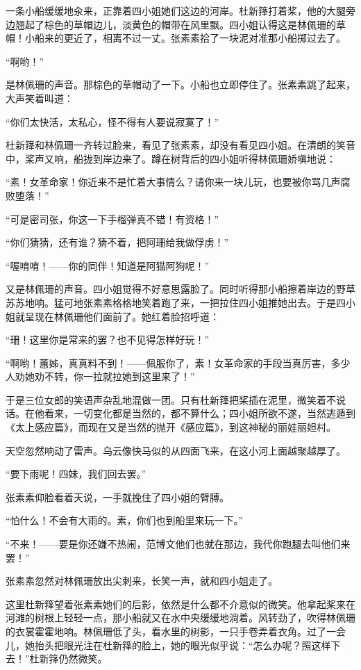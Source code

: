 \par 一条小船缓缓地汆来，正靠着四小姐她们这边的河岸。杜新箨打着桨，他的大腿旁边翘起了棕色的草帽边儿，淡黄色的帽带在风里飘。四小姐认得这是林佩珊的草帽！小船来的更近了，相离不过一丈。张素素拾了一块泥对准那小船掷过去了。
\par “啊哟！”
\par 是林佩珊的声音。那棕色的草帽动了一下。小船也立即停住了。张素素跳了起来，大声笑着叫道：
\par “你们太快活，太私心，怪不得有人要说寂寞了！”
\par 杜新箨和林佩珊一齐转过脸来，看见了张素素，却没有看见四小姐。在清朗的笑音中，桨声又响，船拢到岸边来了。蹲在树背后的四小姐听得林佩珊娇嗔地说：
\par “素！女革命家！你近来不是忙着大事情么？请你来一块儿玩，也要被你骂几声腐败堕落！”
\par “可是密司张，你这一下手榴弹真不错！有资格！”
\par “你们猜猜，还有谁？猜不着，把阿珊给我做俘虏！”
\par “喔唷唷！——你的同伴！知道是阿猫阿狗呢！”
\par 又是林佩珊的声音。四小姐觉得不好意思露脸了。同时听得那小船擦着岸边的野草苏苏地响。猛可地张素素格格地笑着跑了来，一把拉住四小姐推她出去。于是四小姐就呈现在林佩珊他们面前了。她红着脸招呼道：
\par “珊！这里你是常来的罢？也不见得怎样好玩！”
\par “啊哟！蕙姊，真真料不到！——佩服你了，素！女革命家的手段当真厉害，多少人劝她劝不转，你一拉就拉她到这里来了！”
\par 于是三位女郎的笑语声杂乱地混做一团。只有杜新箨把桨插在泥里，微笑着不说话。在他看来，一切变化都是当然的，都不算什么；四小姐所欲不遂，当然逃遁到《太上感应篇》，而现在又是当然的抛开《感应篇》，到这神秘的丽娃丽妲村。
\par 天空忽然响动了雷声。乌云像快马似的从四面飞来，在这小河上面越聚越厚了。
\par “要下雨呢！四妹，我们回去罢。”
\par 张素素仰脸看着天说，一手就挽住了四小姐的臂膊。
\par “怕什么！不会有大雨的。素，你们也到船里来玩一下。”
\par “不来！——要是你还嫌不热闹，范博文他们也就在那边，我代你跑腿去叫他们来罢！”
\par 张素素忽然对林佩珊放出尖刺来，长笑一声，就和四小姐走了。
\par 这里杜新箨望着张素素她们的后影，依然是什么都不介意似的微笑。他拿起桨来在河滩的树根上轻轻一点，那小船就又在水中央缓缓地淌着。风转劲了，吹得林佩珊的衣裳霍霍地响。林佩珊低了头，看水里的树影，一只手卷弄着衣角。过了一会儿，她抬头把眼光注在杜新箨的脸上，她的眼光似乎说：“怎么办呢？照这样下去！”杜新箨仍然微笑。
